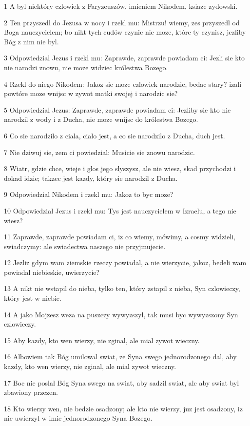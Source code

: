\par 1 A byl niektóry czlowiek z Faryzeuszów, imieniem Nikodem, ksiaze zydowski.
\par 2 Ten przyszedl do Jezusa w nocy i rzekl mu: Mistrzu! wiemy, zes przyszedl od Boga nauczycielem; bo nikt tych cudów czynic nie moze, które ty czynisz, jezliby Bóg z nim nie byl.
\par 3 Odpowiedzial Jezus i rzekl mu: Zaprawde, zaprawde powiadam ci: Jezli sie kto nie narodzi znowu, nie moze widziec królestwa Bozego.
\par 4 Rzekl do niego Nikodem: Jakoz sie moze czlowiek narodzic, bedac stary? izali powtóre moze wnijsc w zywot matki swojej i narodzic sie?
\par 5 Odpowiedzial Jezus: Zaprawde, zaprawde powiadam ci: Jezliby sie kto nie narodzil z wody i z Ducha, nie moze wnijsc do królestwa Bozego.
\par 6 Co sie narodzilo z ciala, cialo jest, a co sie narodzilo z Ducha, duch jest.
\par 7 Nie dziwuj sie, zem ci powiedzial: Musicie sie znowu narodzic.
\par 8 Wiatr, gdzie chce, wieje i glos jego slyszysz, ale nie wiesz, skad przychodzi i dokad idzie; takzec jest kazdy, który sie narodzil z Ducha.
\par 9 Odpowiedzial Nikodem i rzekl mu: Jakoz to byc moze?
\par 10 Odpowiedzial Jezus i rzekl mu: Tys jest nauczycielem w Izraelu, a tego nie wiesz?
\par 11 Zaprawde, zaprawde powiadam ci, iz co wiemy, mówimy, a cosmy widzieli, swiadczymy: ale swiadectwa naszego nie przyjmujecie.
\par 12 Jezliz gdym wam ziemskie rzeczy powiadal, a nie wierzycie, jakoz, bedeli wam powiadal niebieskie, uwierzycie?
\par 13 A nikt nie wstapil do nieba, tylko ten, który zstapil z nieba, Syn czlowieczy, który jest w niebie.
\par 14 A jako Mojzesz weza na puszczy wywyzszyl, tak musi byc wywyzszony Syn czlowieczy.
\par 15 Aby kazdy, kto wen wierzy, nie zginal, ale mial zywot wieczny.
\par 16 Albowiem tak Bóg umilowal swiat, ze Syna swego jednorodzonego dal, aby kazdy, kto wen wierzy, nie zginal, ale mial zywot wieczny.
\par 17 Boc nie poslal Bóg Syna swego na swiat, aby sadzil swiat, ale aby swiat byl zbawiony przezen.
\par 18 Kto wierzy wen, nie bedzie osadzony; ale kto nie wierzy, juz jest osadzony, iz nie uwierzyl w imie jednorodzonego Syna Bozego.

